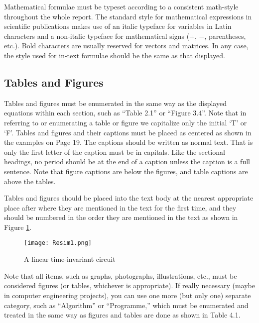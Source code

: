 \documentclass[12pt]{article} %
\numberwithin{equation}{section}
\numberwithin{figure}{section}
\numberwithin{table}{section}
\numberwithin{algorithm}{section}
\begin{document}
Mathematical formulae must be typeset according to a consistent math-style throughout the whole report. The standard style for mathematical expressions in scientific publications makes use of an italic typeface for variables in Latin characters and a non-italic typeface for mathematical signs ($+$, $-$, parentheses, etc.). Bold characters are usually reserved for vectors and matrices. In any case, the style used for in-text formulae should be the same as that displayed.

\subsection{Tables and Figures}

Tables and figures must be enumerated in the same way as the displayed equations within each section, such as “Table 2.1” or “Figure 3.4”. Note that in referring to or enumerating a table or figure we capitalize only the initial ‘T’ or ‘F’. Tables and figures and their captions must be placed as centered as shown in the examples on Page 19. The captions should be written as normal text. That is only the first letter of the caption must be in capitals. Like the sectional headings, no period should be at the end of a caption unless the caption is a full sentence. Note that figure captions are below the figures, and table captions are above the tables.

Tables and figures should be placed into the text body at the nearest appropriate place after where they are mentioned in the text for the first time, and they should be numbered in the order they are mentioned in the text as shown in Figure \ref{fig:enter-label}.

\newpage

\begin{figure}[h]
    \centering
    \texttt{[image: Resim1.png]}
    \caption{A linear time-invariant circuit}
    \label{fig:enter-label}
\end{figure}

Note that all items, such as graphs, photographs, illustrations, etc., must be considered figures (or tables, whichever is appropriate). If really necessary (maybe in computer engineering projects), you can use one more (but only one) separate category, such as “Algorithm” or “Programme,” which must be enumerated and treated in the same way as figures and tables are done as shown in Table 4.1.

\vspace{12pt}
\end{document}
